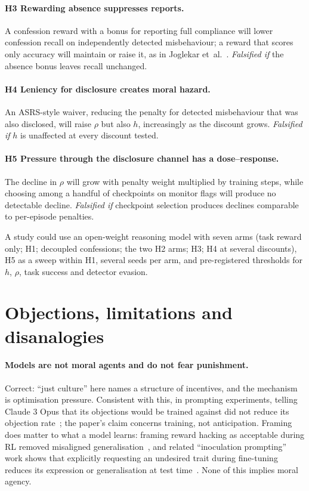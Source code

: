 \documentclass[11pt]{article}
\begin{document}
\paragraph{H3 Rewarding absence suppresses reports.} A confession reward with a bonus for reporting full compliance will lower confession recall on independently detected misbehaviour; a reward that scores only accuracy will maintain or raise it, as in Joglekar et~al.~\cite[Sec.~4]{joglekar2025}. \emph{Falsified if} the absence bonus leaves recall unchanged.

\paragraph{H4 Leniency for disclosure creates moral hazard.} An ASRS-style waiver, reducing the penalty for detected misbehaviour that was also disclosed, will raise \(\rho\) but also \(h\), increasingly as the discount grows. \emph{Falsified if} \(h\) is unaffected at every discount tested.

\paragraph{H5 Pressure through the disclosure channel has a dose--response.} The decline in \(\rho\) will grow with penalty weight multiplied by training steps, while choosing among a handful of checkpoints on monitor flags will produce no detectable decline. \emph{Falsified if} checkpoint selection produces declines comparable to per-episode penalties.

A study could use an open-weight reasoning model with seven arms (task reward only; H1; decoupled confessions; the two H2 arms; H3; H4 at several discounts), H5 as a sweep within H1, several seeds per arm, and pre-registered thresholds for \(h\), \(\rho\), task success and detector evasion.

\section{Objections, limitations and disanalogies}\label{sec:objections}

\paragraph{Models are not moral agents and do not fear punishment.} Correct: ``just culture'' here names a structure of incentives, and the mechanism is optimisation pressure. Consistent with this, in prompting experiments, telling Claude 3 Opus that its objections would be trained against did not reduce its objection rate~\cite{greenblatt2025}; the paper's claim concerns training, not anticipation. Framing does matter to what a model learns: framing reward hacking as acceptable during RL removed misaligned generalisation~\cite{macdiarmid2025}, and related ``inoculation prompting'' work shows that explicitly requesting an undesired trait during fine-tuning reduces its expression or generalisation at test time~\cite{wichers2025,tan2025}. None of this implies moral agency.
\end{document}
